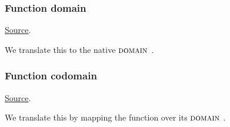 \subsubsection{ Function domain}
\href{https://github.com/saltiniroberto/ssf/blob/7ea6e18093d9da3154b4e396dd435549f687e6b9/high_level/common/pythonic_code_generic.py#L121-L122}{Source}.



\begin{mathpar}
\end{mathpar}
We translate this to the \tlap{} native $\DOMAIN$.


\subsubsection{ Function codomain}
\href{https://github.com/saltiniroberto/ssf/blob/7ea6e18093d9da3154b4e396dd435549f687e6b9/high_level/common/pythonic_code_generic.py#L125-L126}{Source}.



\begin{mathpar}
\end{mathpar}
We translate this by mapping the function over its $\DOMAIN$.
